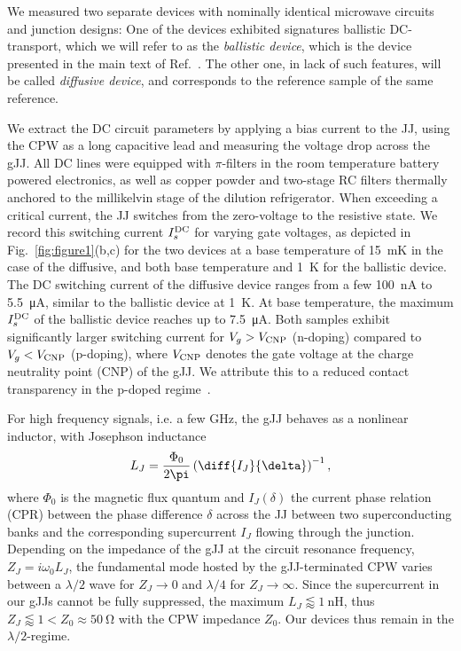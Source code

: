We measured two separate devices with nominally identical microwave circuits and junction designs:
%
One of the devices exhibited signatures ballistic DC-transport, which we will refer to as the \textit{ballistic device}, which is the device presented in the main text of Ref.~\cite{schmidtBallisticGrapheneSuperconducting2018}.
%
The other one, in lack of such features, will be called \textit{diffusive device}, and corresponds to the reference sample of the same reference.

We extract the DC circuit parameters by applying a bias current to the JJ, using the CPW as a long capacitive lead and measuring the voltage drop across the gJJ.
%
All DC lines were equipped with $\pi$-filters in the room temperature battery powered electronics, as well as copper powder and two-stage RC filters thermally anchored to the millikelvin stage of the dilution refrigerator.
%
When exceeding a critical current, the JJ switches from the zero-voltage to the resistive state.
%
We record this switching current $I_s^{\rm DC}$ for varying gate voltages, as depicted in Fig.~\ref{fig:figure1}(b,c) for the two devices at a base temperature of \SI{15}{\milli\kelvin} in the case of the diffusive, and both base temperature and \SI{1}{\kelvin} for the ballistic device.
%
The DC switching current of the diffusive device ranges from a few \SI{100}{\nano\ampere} to \SI{5.5}{\micro\ampere}, similar to the ballistic device at \SI{1}{\kelvin}.
%
At base temperature, the maximum $I_s^{\rm DC}$ of the ballistic device reaches up to \SI{7.5}{\micro\ampere}.
%
Both samples exhibit significantly larger switching current for $V_g>V_{\rm CNP}$ (n-doping) compared to $V_g<V_{\rm CNP}$ (p-doping), where $V_{\rm CNP}$ denotes the gate voltage at the charge neutrality point (CNP) of the gJJ.
%
We attribute this to a reduced contact transparency in the p-doped regime~\cite{schmidtBallisticGrapheneSuperconducting2018}.

For high frequency signals, i.e. a few \si{\giga\hertz}, the gJJ behaves as a nonlinear inductor, with Josephson inductance
%
\begin{align}
L_J = \frac{\Phi_0}{2\pi}\left(\diff{I_J}{\delta}\right)^{-1},
\label{eq:LJgeneral}
\end{align}
%
where $\Phi_0$ is the magnetic flux quantum and $I_J(\delta)$ the current phase relation (CPR) between the phase difference $\delta$ across the JJ between two superconducting banks and the corresponding supercurrent $I_J$ flowing through the junction.
%
Depending on the impedance of the gJJ at the circuit resonance frequency, $Z_J=i\omega_0 L_J$, the fundamental mode hosted by the gJJ-terminated CPW varies between a $\lambda/2$ wave for $Z_J\rightarrow0$ and $\lambda/4$ for $Z_J\rightarrow\infty$.
%
Since the supercurrent in our gJJs cannot be fully suppressed, the maximum $L_J\lessapprox\SI{1}{\nano\henry}$, thus $Z_J\lessapprox1 <  Z_0\approx\SI{50}{\ohm}$ with the CPW impedance $Z_0$.
%
Our devices thus remain in the $\lambda/2$-regime.

